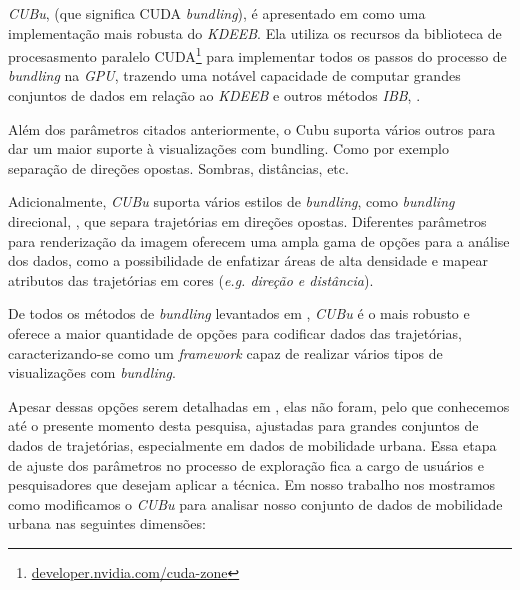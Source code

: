 \emph{CUBu}, (que significa CUDA \emph{bundling}), é apresentado em \cite{zwan:16}
como uma implementação mais robusta do \emph{KDEEB}. Ela utiliza os recursos da biblioteca de procesasmento
paralelo CUDA\footnote{\url{developer.nvidia.com/cuda-zone}} para implementar
todos os passos do processo de \emph{bundling} na \emph{GPU}, trazendo uma notável capacidade
de computar grandes conjuntos de dados em relação ao \emph{KDEEB} e
outros métodos \emph{IBB}, \citet{adeb,lhuillier-fft:17}.

Além dos parâmetros citados anteriormente, o Cubu suporta vários
outros para dar um maior suporte à visualizações com bundling. Como por
exemplo separação de direções opostas. Sombras, distâncias, etc.

Adicionalmente, \emph{CUBu} suporta vários estilos de \emph{bundling},
como \emph{bundling} direcional, \citep{adeb}, que separa trajetórias
em direções opostas. Diferentes parâmetros para renderização da imagem oferecem
uma ampla gama de opções para a análise dos dados, como a possibilidade de
enfatizar áreas de alta densidade e mapear atributos das trajetórias
em cores (\emph{e.g. direção e distância}).
 
De todos os métodos de \emph{bundling} levantados em \cite{lhuillier:17},
\emph{CUBu} é o mais robusto e oferece a maior quantidade de opções para codificar
dados das trajetórias, caracterizando-se como um \emph{framework} capaz de realizar
vários tipos de visualizações com \emph{bundling}.


Apesar dessas opções serem detalhadas em \cite{zwan:16},
elas não foram, pelo que conhecemos até o presente momento desta pesquisa, ajustadas para
grandes conjuntos de dados de trajetórias, especialmente em dados de mobilidade urbana.
Essa etapa de ajuste dos parâmetros no processo de exploração fica a cargo de usuários e pesquisadores
que desejam aplicar a técnica. Em nosso trabalho nos mostramos como modificamos
o \emph{CUBu} para analisar nosso conjunto de dados de mobilidade urbana nas seguintes
dimensões:

